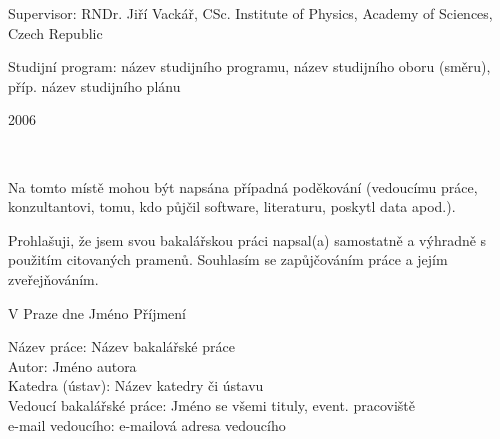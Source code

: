 \documentclass[12pt,notitlepage]{report}
\begin{document}
\begin{titlepage}
\large
\noindent Supervisor: RNDr. Jiří Vackář, CSc. Institute of Physics,
\hskip20mm   Academy of Sciences, Czech Republic
\vspace{1mm}

\noindent Studijní program: název studijního programu, název studijního %
\hskip20mm oboru (směru),  příp. název studijního plánu

\vspace{20mm}

\begin{center}
2006 %
\end{center}

\end{titlepage} %

\normalsize %
\setcounter{page}{2} %
\ \vspace{10mm} 

\noindent Na tomto místě mohou být napsána případná poděkování (vedoucímu práce, konzultantovi, tomu, kdo půjčil software, literaturu, poskytl data apod.). %

\vspace{\fill} %
\noindent Prohlašuji, že jsem svou bakalářskou práci napsal(a) samostatně a výhradně s použitím citovaných pramenů. Souhlasím se zapůjčováním práce a jejím zveřejňováním.

\bigskip
\noindent V Praze dne \hspace{\fill}Jméno Příjmení\\ %


\tableofcontents %

\newpage %

\noindent
Název práce: Název bakalářské práce\\
Autor: Jméno autora\\
Katedra (ústav): Název katedry či ústavu\\
Vedoucí bakalářské práce: Jméno se všemi tituly, event. pracoviště\\
e-mail vedoucího: e-mailová adresa vedoucího\\
\end{document}
